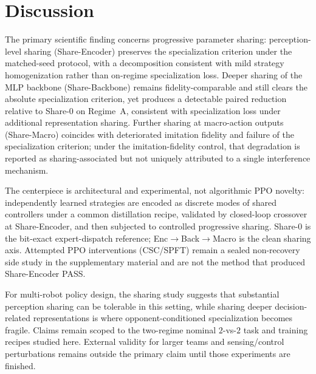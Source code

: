 \section{Discussion}
\label{sec:discussion}

The primary scientific finding concerns progressive parameter sharing:
perception-level sharing (Share-Encoder) preserves the specialization criterion
under the matched-seed protocol, with a decomposition consistent with mild
strategy homogenization rather than on-regime specialization loss. Deeper
sharing of the MLP backbone (Share-Backbone) remains fidelity-comparable and
still clears the absolute specialization criterion, yet produces a detectable
paired reduction relative to Share-0 on Regime~A, consistent with specialization
loss under additional representation sharing. Further sharing at macro-action
outputs (Share-Macro) coincides with deteriorated imitation fidelity and failure
of the specialization criterion; under the imitation-fidelity control, that
degradation is reported as sharing-associated but not uniquely attributed to a
single interference mechanism.

The centerpiece is architectural and experimental, not algorithmic PPO novelty:
independently learned strategies are encoded as discrete modes of shared
controllers under a common distillation recipe, validated by closed-loop
crossover at Share-Encoder, and then subjected to controlled progressive
sharing. Share-0 is the bit-exact expert-dispatch reference; Enc$\rightarrow$Back$\rightarrow$Macro
is the clean sharing axis. Attempted PPO interventions (CSC/SPFT) remain a
sealed non-recovery side study in the supplementary material and are not the
method that produced Share-Encoder PASS.

For multi-robot policy design, the sharing study suggests that substantial
perception sharing can be tolerable in this setting, while sharing deeper
decision-related representations is where opponent-conditioned specialization
becomes fragile. Claims remain scoped to the two-regime nominal $2$-vs-$2$ task
and training recipes studied here. External validity for larger teams and
sensing/control perturbations remains outside the primary claim until those
experiments are finished.


